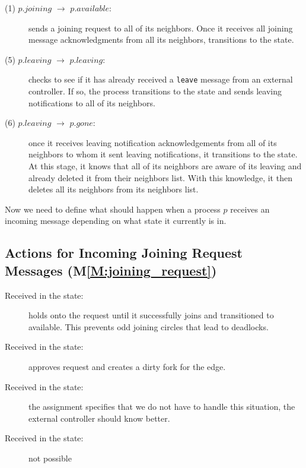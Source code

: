 \documentclass[11pt]{article}
\begin{document}
\begin{description}
\item[(1) $p.joining$ $\to$ $p.available$:] sends a joining request to all of its neighbors. Once it receives all joining message acknowledgments from all its neighbors, transitions to the \available state.

\item[(5) $p.leaving$ $\to$ $p.leaving$:] checks to see if it has already received a \texttt{leave} message from an external controller. If so, the process transitions to the \leaving state and sends leaving notifications to all of its neighbors. 

\item[(6) $p.leaving$ $\to$ $p.gone$:]
once it receives leaving notification acknowledgements from all of its neighbors to whom it sent leaving notifications, it transitions to the \gone state. At this stage, it knows that all of its neighbors are aware of its leaving and already deleted it from their neighbors list. With this knowledge, it then deletes all its neighbors from its neighbors list.
\end{description}

Now we need to define what should happen when a process $p$ receives an incoming message depending on what state it currently is in.

\subsection{Actions for Incoming Joining Request Messages (M\ref{M:joining_request})}
\begin{description}
\item[Received in the \joining state:] holds onto the request until it successfully joins and transitioned to available. This prevents odd joining circles that lead to deadlocks.
\item[Received in the \available state:] approves request and creates a dirty fork for the edge.
\item[Received in the \leaving state:] the assignment specifies that we do not have to handle this situation, the external controller should know better.
\item[Received in the \gone state:] not possible
\end{description}
\end{document}
